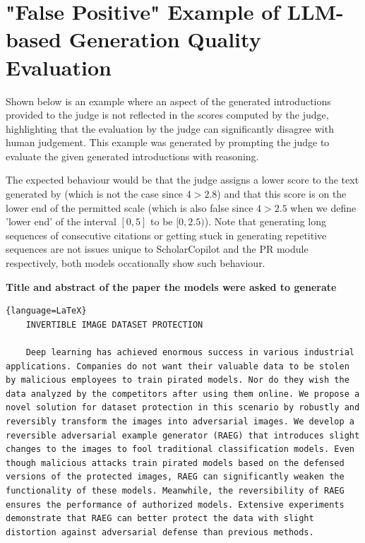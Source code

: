 \section{"False Positive" Example of LLM-based Generation Quality Evaluation}\label{bad-generation-evaluation-example}
Shown below is an example where an aspect of the generated introductions provided to the judge is not reflected in the scores computed by the judge, highlighting that the evaluation by the judge can significantly disagree with human judgement. This example was generated by prompting the judge to evaluate the given generated introductions with reasoning.

The expected behaviour would be that the judge assigns a lower  score to the text generated by  (which is not the case since $4>2.8$) and that this score is on the lower end of the permitted scale (which is also false since $4>2.5$ when we define 'lower end' of the interval $[0,5]$ to be $[0,2.5)$). Note that generating long sequences of consecutive citations or getting stuck in generating repetitive sequences are not issues unique to ScholarCopilot and the PR module respectively, both models occationally show such behaviour.

\textbf{Title and abstract of the paper the models were asked to generate}
\begin{lstlisting}{language=LaTeX}
    INVERTIBLE IMAGE DATASET PROTECTION

    Deep learning has achieved enormous success in various industrial applications. Companies do not want their valuable data to be stolen by malicious employees to train pirated models. Nor do they wish the data analyzed by the competitors after using them online. We propose a novel solution for dataset protection in this scenario by robustly and reversibly transform the images into adversarial images. We develop a reversible adversarial example generator (RAEG) that introduces slight changes to the images to fool traditional classification models. Even though malicious attacks train pirated models based on the defensed versions of the protected images, RAEG can significantly weaken the functionality of these models. Meanwhile, the reversibility of RAEG ensures the performance of authorized models. Extensive experiments demonstrate that RAEG can better protect the data with slight distortion against adversarial defense than previous methods.
\end{lstlisting}

